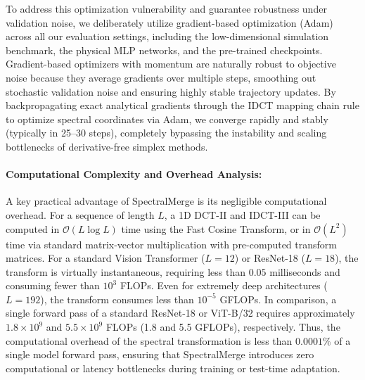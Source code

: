 To address this optimization vulnerability and guarantee robustness under validation noise, we deliberately utilize gradient-based optimization (Adam) across all our evaluation settings, including the low-dimensional simulation benchmark, the physical MLP networks, and the pre-trained checkpoints. Gradient-based optimizers with momentum are naturally robust to objective noise because they average gradients over multiple steps, smoothing out stochastic validation noise and ensuring highly stable trajectory updates. By backpropagating exact analytical gradients through the IDCT mapping chain rule to optimize spectral coordinates via Adam, we converge rapidly and stably (typically in 25--30 steps), completely bypassing the instability and scaling bottlenecks of derivative-free simplex methods.

\paragraph{Computational Complexity and Overhead Analysis:}
A key practical advantage of SpectralMerge is its negligible computational overhead. For a sequence of length $L$, a 1D DCT-II and IDCT-III can be computed in $\mathcal{O}(L \log L)$ time using the Fast Cosine Transform, or in $\mathcal{O}(L^2)$ time via standard matrix-vector multiplication with pre-computed transform matrices. For a standard Vision Transformer ($L=12$) or ResNet-18 ($L=18$), the transform is virtually instantaneous, requiring less than $0.05$ milliseconds and consuming fewer than $10^3$ FLOPs. Even for extremely deep architectures ($L=192$), the transform consumes less than $10^{-5}$ GFLOPs. In comparison, a single forward pass of a standard ResNet-18 or ViT-B/32 requires approximately $1.8 \times 10^9$ and $5.5 \times 10^9$ FLOPs (1.8 and 5.5 GFLOPs), respectively. Thus, the computational overhead of the spectral transformation is less than $0.0001\%$ of a single model forward pass, ensuring that SpectralMerge introduces zero computational or latency bottlenecks during training or test-time adaptation.
